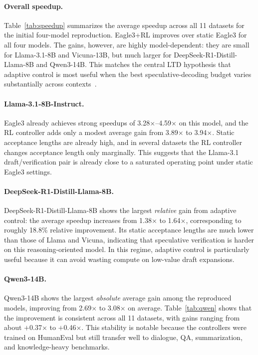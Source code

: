 \documentclass[letterpaper,twocolumn,10pt]{article}
\begin{document}
\paragraph{Overall speedup.}
Table~\ref{tab:speedup} summarizes the average speedup across all 11 datasets for the initial four-model reproduction. Eagle3+RL improves over static Eagle3 for all four models. The gains, however, are highly model-dependent: they are small for Llama-3.1-8B and Vicuna-13B, but much larger for DeepSeek-R1-Distill-Llama-8B and Qwen3-14B. This matches the central LTD hypothesis that adaptive control is most useful when the best speculative-decoding budget varies substantially across contexts~\cite{ltd2025}.

\paragraph{Llama-3.1-8B-Instruct.}
Eagle3 already achieves strong speedups of 3.28$\times$--4.59$\times$ on this model, and the RL controller adds only a modest average gain from 3.89$\times$ to 3.94$\times$. Static acceptance lengths are already high, and in several datasets the RL controller changes acceptance length only marginally. This suggests that the Llama-3.1 draft/verification pair is already close to a saturated operating point under static Eagle3 settings.

\paragraph{DeepSeek-R1-Distill-Llama-8B.}
DeepSeek-R1-Distill-Llama-8B shows the largest \emph{relative} gain from adaptive control: the average speedup increases from 1.38$\times$ to 1.64$\times$, corresponding to roughly 18.8\% relative improvement. Its static acceptance lengths are much lower than those of Llama and Vicuna, indicating that speculative verification is harder on this reasoning-oriented model. In this regime, adaptive control is particularly useful because it can avoid wasting compute on low-value draft expansions.

\paragraph{Qwen3-14B.}
Qwen3-14B shows the largest \emph{absolute} average gain among the reproduced models, improving from 2.69$\times$ to 3.08$\times$ on average. Table~\ref{tab:qwen} shows that the improvement is consistent across all 11 datasets, with gains ranging from about $+$0.37$\times$ to $+$0.46$\times$. This stability is notable because the controllers were trained on HumanEval but still transfer well to dialogue, QA, summarization, and knowledge-heavy benchmarks.
\end{document}

